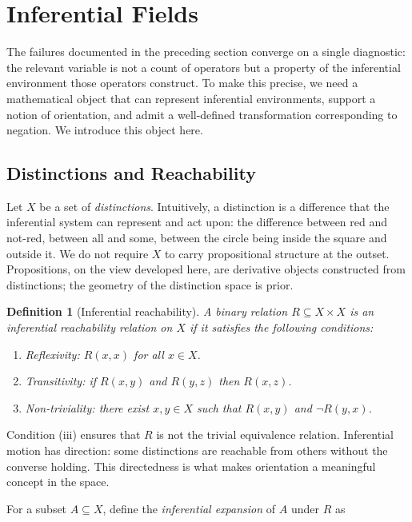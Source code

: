 \documentclass[12pt]{article}
\newtheorem{definition}[theorem]{Definition}
\theoremstyle{remark}
\begin{document}
\section{Inferential Fields}

The failures documented in the preceding section converge on a single
diagnostic: the relevant variable is not a count of operators but a
property of the inferential environment those operators construct. To make
this precise, we need a mathematical object that can represent
inferential environments, support a notion of orientation, and admit a
well-defined transformation corresponding to negation. We introduce this
object here.

\subsection{Distinctions and Reachability}

Let $X$ be a set of \emph{distinctions}. Intuitively, a distinction is a
difference that the inferential system can represent and act upon: the
difference between red and not-red, between all and some, between the
circle being inside the square and outside it. We do not require $X$ to
carry propositional structure at the outset. Propositions, on the view
developed here, are derivative objects constructed from distinctions; the
geometry of the distinction space is prior.

\begin{definition}[Inferential reachability]
A binary relation $R \subseteq X \times X$ is an \emph{inferential
reachability relation} on $X$ if it satisfies the following conditions:
\begin{enumerate}
\item[(i)] \emph{Reflexivity}: $R(x,x)$ for all $x \in X$.
\item[(ii)] \emph{Transitivity}: if $R(x,y)$ and $R(y,z)$ then $R(x,z)$.
\item[(iii)] \emph{Non-triviality}: there exist $x, y \in X$ such that
$R(x,y)$ and $\neg R(y,x)$.
\end{enumerate}
\end{definition}

Condition (iii) ensures that $R$ is not the trivial equivalence relation.
Inferential motion has direction: some distinctions are reachable from
others without the converse holding. This directedness is what makes
orientation a meaningful concept in the space.

For a subset $A \subseteq X$, define the \emph{inferential expansion} of
$A$ under $R$ as
\end{document}
